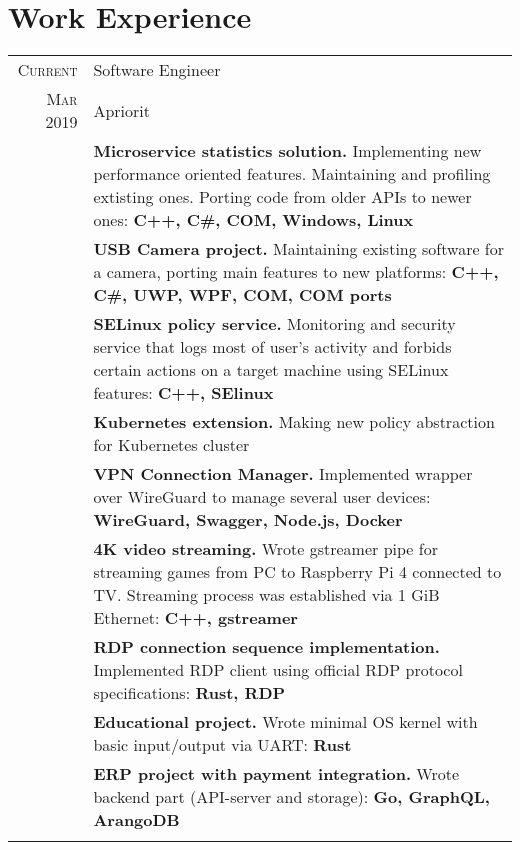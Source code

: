\documentclass[a4paper,10pt]{article}
\begin{document}
\section{Work Experience}
\begin{tabular}{r|p{14cm}}
\textsc{Current}    & Software Engineer \\
\textsc{Mar} 2019   & Apriorit \\
                    & \footnotesize{\textbf{Microservice statistics solution.} Implementing new performance oriented features. Maintaining and profiling extisting ones. Porting code from older APIs to newer ones: \textbf{C++, C\#, COM, Windows, Linux}} \\
                    & \footnotesize{\textbf{USB Camera project.} Maintaining existing software for a camera, porting main features to new platforms: \textbf{C++, C\#, UWP, WPF, COM, COM ports}} \\
                    & \footnotesize{\textbf{SELinux policy service.} Monitoring and security service that logs most of user's activity and forbids certain actions on a target machine using SELinux features: \textbf{C++, SElinux}} \\
                    & \footnotesize{\textbf{Kubernetes extension.} Making new policy abstraction for Kubernetes cluster} \\
                    & \footnotesize{\textbf{VPN Connection Manager.} Implemented wrapper over WireGuard to manage several user devices: \textbf{WireGuard, Swagger, Node.js, Docker}} \\
                    & \footnotesize{\textbf{4K video streaming.} Wrote gstreamer pipe for streaming games from PC to Raspberry Pi 4 connected to TV. Streaming process was established via 1 GiB Ethernet: \textbf{C++, gstreamer}} \\
                    & \footnotesize{\textbf{RDP connection sequence implementation.} Implemented RDP client using official RDP protocol specifications: \textbf{Rust, RDP}} \\    
                    & \footnotesize{\textbf{Educational project.} Wrote minimal OS kernel with basic input/output via UART: \textbf{Rust}} \\
					& \footnotesize{\textbf{ERP project with payment integration.} Wrote backend part (API-server and storage): \textbf{Go, GraphQL, ArangoDB}} \\

\multicolumn{2}{c}{} \\


\end{tabular}
\end{document}

